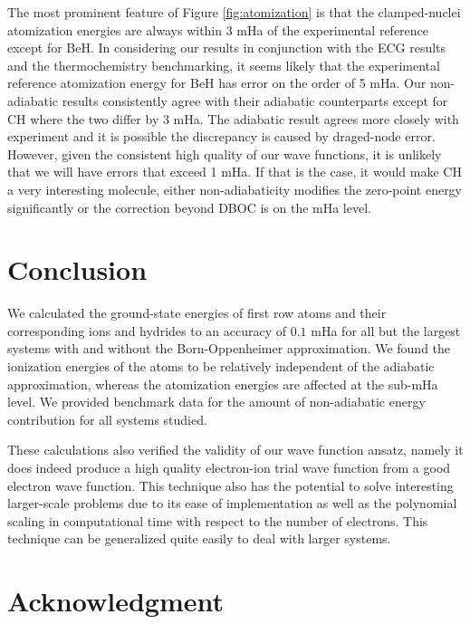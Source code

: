 \documentclass[pra,superscriptaddress,groupedaddress,twocolumn]{revtex4}
\begin{document}
The most prominent feature of Figure \ref{fig:atomization} is that the clamped-nuclei atomization energies are always within 3 mHa of the experimental reference except for BeH.  In considering our results in conjunction with the ECG results and the thermochemistry benchmarking, it seems likely that the experimental reference atomization energy for BeH has error on the order of 5 mHa. 
Our non-adiabatic results consistently agree with their adiabatic counterparts except for CH where the two differ by 3 mHa. The adiabatic result agrees more closely with experiment and it is possible the discrepancy is caused by draged-node error. However, given the consistent high quality of our wave functions, it is unlikely that we will have errors that exceed 1 mHa. If that is the case, it would make CH a very interesting molecule, either non-adiabaticity modifies the zero-point energy significantly or the correction beyond DBOC is on the mHa level.


\section{Conclusion}
We calculated the ground-state energies of first row atoms and their corresponding ions and hydrides to an accuracy of $0.1$ mHa for all but the largest systems with and without the Born-Oppenheimer approximation. We found the ionization energies of the atoms to be relatively independent of the adiabatic approximation, whereas the atomization energies are affected at the sub-mHa level. We provided benchmark data for the amount of non-adiabatic energy contribution for all systems studied. %

These calculations also verified the validity of our wave function ansatz, namely it does indeed produce a high quality electron-ion trial wave function from a good electron wave function. This technique also has the potential to solve interesting larger-scale problems due to its ease of implementation as well as the polynomial scaling in computational time with respect to the number of electrons.  This technique can be generalized quite easily to deal with larger systems.

\section{Acknowledgment}



\end{document}
